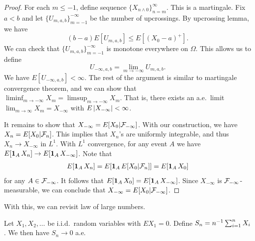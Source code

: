 \documentclass[a4paper]{article}
\begin{document}
\begin{proof}
  For each $m \leq -1$, define sequence $\{ X_{n \wedge 0} \}_{n = m}^\infty$.
  This is a martingale. Fix $a < b$ and let $\{ U_{m, a, b} \}_{m=-1}^{-\infty}$
  be the number of upcrossings. By upcrossing lemma, we have
  \[
    (b - a) E[ U_{m, a, b} ] \leq E [(X_0 - a)^+].
  \]
  We can check that $\{ U_{m, a, b} \}_{m=-1}^{-\infty}$ is monotone
  everywhere on $\Omega$. This allows us to define
  \[
    U_{-\infty, a, b} = \lim_{m \to -\infty} U_{m, a, b}.
  \]
  We have $E[ U_{-\infty, a, b} ]< \infty$. The rest of the argument
  is similar to martingale convergence theorem, and we can show
  that $\liminf_{m \to -\infty} X_m = \limsup_{m \to -\infty} X_m$.
  That is, there exists an a.e.\ limit $\lim_{m \to \infty} X_m =
    X_{-\infty}$ with $E \left\lvert X_{-\infty}\right\rvert < \infty$.

  It remains to show that
  $X_{- \infty} = E [X_0 | \mathcal{F}_{-\infty}]$.
  With our construction, we have $X_n = E[X_0 | \mathcal{F}_n]$.
  This implies that $X_n$'s are uniformly integrable, and thus
  $X_n \to X_{-\infty}$ in $L^1$.
  With $L^1$ convergence, for any event $A$ we have
  $E[\operatorname{\mathbf{1}}_A X_n] \to E[\operatorname{\mathbf{1}}_A X_{-\infty}]$. Note that
  \begin{align*}
    E[\operatorname{\mathbf{1}}_A X_n] = E [\operatorname{\mathbf{1}}_A E[X_0 | \mathcal{F}_n]] = E [\operatorname{\mathbf{1}}_A X_0]
  \end{align*}
  for any $A \in \mathcal{F}_{-\infty}$. It follows that
  $E[\operatorname{\mathbf{1}}_A X_0] = E[\operatorname{\mathbf{1}}_A X_{-\infty}]$. Since $X_{-\infty}$
  is $\mathcal{F}_{-\infty}$-measurable, we can conclude that
  $X_{-\infty} = E[X_0 | \mathcal{F}_{-\infty}]$.

\end{proof}


With this, we can revisit law of large numbers.
\begin{thm}
  Let $X_1, X_2, \dots$ be i.i.d.\ random variables with $E X_1 = 0$.
  Define $S_n = n^{-1} \sum_{i=1}^n X_i$. We then have
  $S_n \to 0$ a.e.
\end{thm}
\end{document}
